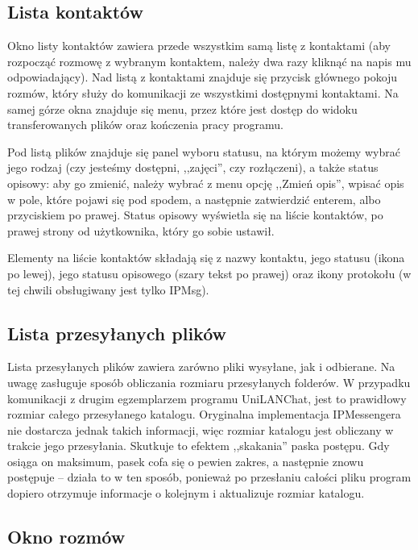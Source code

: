 \documentclass[11pt,leqno]{article}
\begin{document}
\subsection{Lista kontaktów}

Okno listy kontaktów zawiera przede wszystkim samą listę z kontaktami (aby rozpocząć rozmowę
z wybranym kontaktem, należy dwa razy kliknąć na napis mu odpowiadający). Nad listą z kontaktami
znajduje się przycisk głównego pokoju rozmów, który służy do komunikacji ze wszystkimi dostępnymi
kontaktami. Na samej górze okna znajduje się menu, przez które jest dostęp do widoku transferowanych
plików oraz kończenia pracy programu.

Pod listą plików znajduje się panel wyboru statusu, na którym możemy wybrać jego rodzaj (czy jesteśmy
dostępni, ,,zajęci'', czy rozłączeni), a także status opisowy: aby go zmienić, należy wybrać
z menu opcję ,,Zmień opis'', wpisać opis w pole, które pojawi się pod spodem, a następnie
zatwierdzić enterem, albo przyciskiem po prawej. Status opisowy wyświetla się na liście kontaktów,
po prawej strony od użytkownika, który go sobie ustawił.

Elementy na liście kontaktów składają się z nazwy kontaktu, jego statusu (ikona po lewej), jego
statusu opisowego (szary tekst po prawej) oraz ikony protokołu (w tej chwili obsługiwany jest tylko
IPMsg).

\subsection{Lista przesyłanych plików}

Lista przesyłanych plików zawiera zarówno pliki wysyłane, jak i odbierane. Na uwagę zasługuje sposób
obliczania rozmiaru przesyłanych folderów. W przypadku komunikacji z drugim egzemplarzem programu
UniLANChat, jest to prawidłowy rozmiar całego przesyłanego katalogu. Oryginalna implementacja
IPMessengera nie dostarcza jednak takich informacji, więc rozmiar katalogu jest obliczany w trakcie
jego przesyłania. Skutkuje to efektem ,,skakania'' paska postępu. Gdy osiąga on maksimum, pasek
cofa się o pewien zakres, a następnie znowu postępuje -- działa to w ten sposób, ponieważ po
przesłaniu całości pliku program dopiero otrzymuje informacje o kolejnym i aktualizuje rozmiar
katalogu.

\subsection{Okno rozmów}
\end{document}
